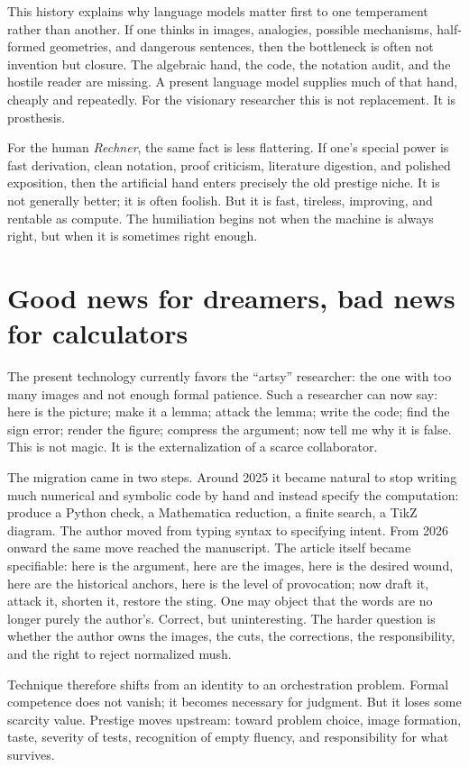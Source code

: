 \documentclass[
  aps,
  reprint,
  superscriptaddress,
  floatfix,
  nofootinbib,
  longbibliography
]{revtex4-2}
\begin{document}
This history explains why language models matter first to one temperament rather
than another. If one thinks in images, analogies, possible mechanisms,
half-formed geometries, and dangerous sentences, then the bottleneck is often not
invention but closure. The algebraic hand, the code, the notation audit, and the
hostile reader are missing. A present language model supplies much of that hand,
cheaply and repeatedly. For the visionary researcher this is not replacement. It
is prosthesis.

For the human \emph{Rechner}, the same fact is less flattering. If one's special
power is fast derivation, clean notation, proof criticism, literature digestion,
and polished exposition, then the artificial hand enters precisely the old
prestige niche. It is not generally better; it is often foolish. But it is fast,
tireless, improving, and rentable as compute. The humiliation begins not when the
machine is always right, but when it is sometimes right enough.

\section{Good news for dreamers, bad news for calculators}

The present technology currently favors the ``artsy'' researcher: the one with
too many images and not enough formal patience. Such a researcher can now say:
here is the picture; make it a lemma; attack the lemma; write the code; find the
sign error; render the figure; compress the argument; now tell me why it is
false. This is not magic. It is the externalization of a scarce collaborator.

The migration came in two steps. Around 2025 it became natural to stop writing
much numerical and symbolic code by hand and instead specify the computation:
produce a Python check, a Mathematica reduction, a finite search, a TikZ diagram.
The author moved from typing syntax to specifying intent. From 2026 onward the
same move reached the manuscript. The article itself became specifiable: here is
the argument, here are the images, here is the desired wound, here are the
historical anchors, here is the level of provocation; now draft it, attack it,
shorten it, restore the sting. One may object that the words are no longer purely
the author's. Correct, but uninteresting. The harder question is whether the
author owns the images, the cuts, the corrections, the responsibility, and the
right to reject normalized mush.

Technique therefore shifts from an identity to an orchestration problem. Formal
competence does not vanish; it becomes necessary for judgment. But it loses some
scarcity value. Prestige moves upstream: toward problem choice, image formation,
taste, severity of tests, recognition of empty fluency, and responsibility for
what survives.
\end{document}

